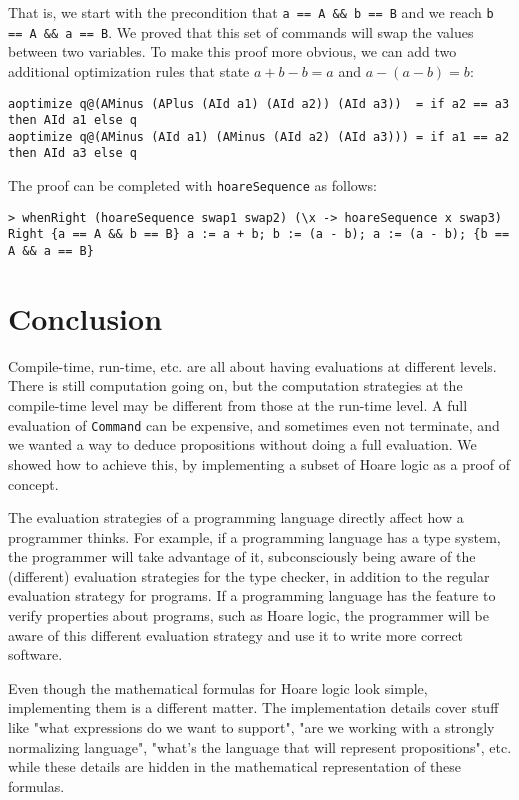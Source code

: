 \documentclass{article}
\begin{document}
That is, we start with the precondition that \texttt{a == A \&\& b == B} and we reach \texttt{b == A \&\& a == B}. We proved that this set of commands will swap the values between two variables. To make this proof more obvious, we can add two additional optimization rules that state $a + b - b = a$ and $a - (a - b) = b$:

\begin{lstlisting}
aoptimize q@(AMinus (APlus (AId a1) (AId a2)) (AId a3))  = if a2 == a3 then AId a1 else q
aoptimize q@(AMinus (AId a1) (AMinus (AId a2) (AId a3))) = if a1 == a2 then AId a3 else q
\end{lstlisting}

The proof can be completed with \texttt{hoareSequence} as follows:

\begin{lstlisting}
> whenRight (hoareSequence swap1 swap2) (\x -> hoareSequence x swap3)
Right {a == A && b == B} a := a + b; b := (a - b); a := (a - b); {b == A && a == B}
\end{lstlisting}

\section{Conclusion}

Compile-time, run-time, etc. are all about having evaluations at different levels. There is still computation going on, but the computation strategies at the compile-time level may be different from those at the run-time level. A full evaluation of \texttt{Command} can be expensive, and sometimes even not terminate, and we wanted a way to deduce propositions without doing a full evaluation. We showed how to achieve this, by implementing a subset of Hoare logic as a proof of concept.

The evaluation strategies of a programming language directly affect how a programmer thinks. For example, if a programming language has a type system, the programmer will take advantage of it, subconsciously being aware of the (different) evaluation strategies for the type checker, in addition to the regular evaluation strategy for programs. If a programming language has the feature to verify properties about programs, such as Hoare logic, the programmer will be aware of this different evaluation strategy and use it to write more correct software.

Even though the mathematical formulas for Hoare logic look simple, implementing them is a different matter. The implementation details cover stuff like "what expressions do we want to support", "are we working with a strongly normalizing language", "what's the language that will represent propositions", etc. while these details are hidden in the mathematical representation of these formulas.
\end{document}

